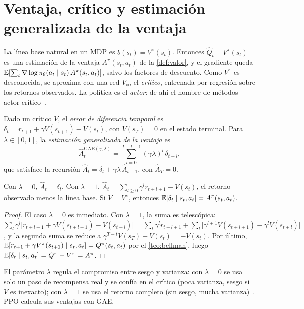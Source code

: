 \section{Ventaja, crítico y estimación generalizada de la ventaja}

La línea base natural en un MDP es $b(s_t)=V^{\pi}(s_t)$. Entonces $\widehat Q_t-V^{\pi}(s_t)$ es una estimación de la ventaja $A^{\pi}(s_t,a_t)$ de la \cref{def:valor}, y el gradiente queda $\mathbb{E}[\sum_t\nabla\log\pi_\theta(a_t\mid s_t)\,A^{\pi}(s_t,a_t)]$, salvo los factores de descuento. Como $V^{\pi}$ es desconocida, se aproxima con una red $V_\phi$, el \emph{crítico}, entrenada por regresión sobre los retornos observados. La política es el \emph{actor}: de ahí el nombre de métodos actor-crítico~\cite[§13.5]{sb}.

\begin{definicion}\label{def:gae}
Dado un crítico $V$, el \emph{error de diferencia temporal} es $\delta_t=r_{t+1}+\gamma V(s_{t+1})-V(s_t)$, con $V(s_T)=0$ en el estado terminal. Para $\lambda\in[0,1]$, la \emph{estimación generalizada de la ventaja} es~\cite{gae}
\[
\widehat A^{\mathrm{GAE}(\gamma,\lambda)}_t=\sum_{l=0}^{T-t-1}(\gamma\lambda)^{l}\,\delta_{t+l},
\]
que satisface la recursión $\widehat A_t=\delta_t+\gamma\lambda\,\widehat A_{t+1}$, con $\widehat A_T=0$.
\end{definicion}

\begin{proposicion}\label{prop:gae}
Con $\lambda=0$, $\widehat A_t=\delta_t$. Con $\lambda=1$, $\widehat A_t=\sum_{l\ge0}\gamma^{l}r_{t+l+1}-V(s_t)$, el retorno observado menos la línea base. Si $V=V^{\pi}$, entonces $\mathbb{E}[\delta_t\mid s_t,a_t]=A^{\pi}(s_t,a_t)$.
\end{proposicion}

\begin{proof}
El caso $\lambda=0$ es inmediato. Con $\lambda=1$, la suma es telescópica:
$\sum_{l}\gamma^{l}\bigl[r_{t+l+1}+\gamma V(s_{t+l+1})-V(s_{t+l})\bigr]=\sum_l\gamma^{l}r_{t+l+1}+\sum_{l}\bigl[\gamma^{l+1}V(s_{t+l+1})-\gamma^{l}V(s_{t+l})\bigr]$, y la segunda suma se reduce a $\gamma^{T-t}V(s_T)-V(s_t)=-V(s_t)$. Por último, $\mathbb{E}[r_{t+1}+\gamma V^{\pi}(s_{t+1})\mid s_t,a_t]=Q^{\pi}(s_t,a_t)$ por el \cref{teo:bellman}, luego $\mathbb{E}[\delta_t\mid s_t,a_t]=Q^{\pi}-V^{\pi}=A^{\pi}$.
\end{proof}

El parámetro $\lambda$ regula el compromiso entre sesgo y varianza: con $\lambda=0$ se usa solo un paso de recompensa real y se confía en el crítico (poca varianza, sesgo si $V$ es inexacto); con $\lambda=1$ se usa el retorno completo (sin sesgo, mucha varianza)~\cite{cs285}. PPO calcula sus ventajas con GAE.

